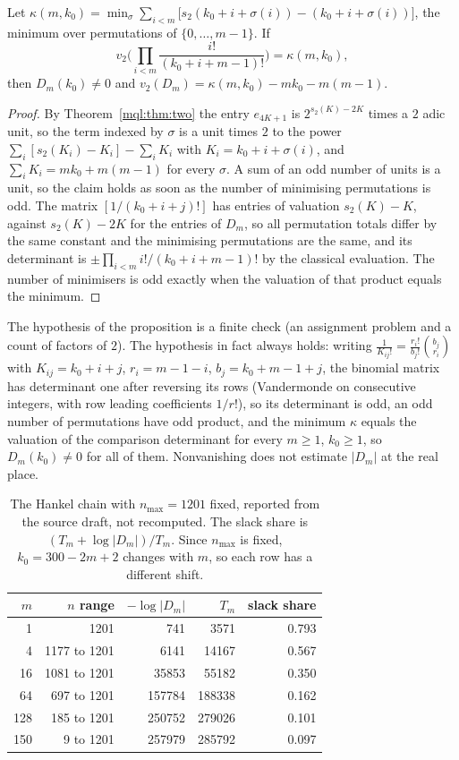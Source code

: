 \begin{proposition}\label{mql:prop:certificate}
Let $\kappa(m,k_0)=\min_\sigma\sum_{i<m}\big[s_2(k_0+i+\sigma(i))-(k_0+i+\sigma(i))\big]$, the minimum over permutations of $\{0,\dots,m-1\}$. If
\[
v_2\Big(\prod_{i<m}\frac{i!}{(k_0+i+m-1)!}\Big)=\kappa(m,k_0),
\]
then $D_m(k_0)\ne0$ and $v_2(D_m)=\kappa(m,k_0)-mk_0-m(m-1)$.
\end{proposition}

\begin{proof}
By Theorem~\ref{mql:thm:two} the entry $e_{4K+1}$ is $2^{s_2(K)-2K}$ times a $2$ adic unit, so the term indexed by $\sigma$ is a unit times $2$ to the power $\sum_i[s_2(K_i)-K_i]-\sum_iK_i$ with $K_i=k_0+i+\sigma(i)$, and $\sum_iK_i=mk_0+m(m-1)$ for every $\sigma$. A sum of an odd number of units is a unit, so the claim holds as soon as the number of minimising permutations is odd. The matrix $[1/(k_0+i+j)!]$ has entries of valuation $s_2(K)-K$, against $s_2(K)-2K$ for the entries of $D_m$, so all permutation totals differ by the same constant and the minimising permutations are the same, and its determinant is $\pm\prod_{i<m}i!/(k_0+i+m-1)!$ by the classical evaluation. The number of minimisers is odd exactly when the valuation of that product equals the minimum.
\end{proof}

The hypothesis of the proposition is a finite check (an assignment problem and a count of factors of $2$). The hypothesis in fact always holds: writing $\frac1{K_{ij}!}=\frac{r_i!}{b_j!}\binom{b_j}{r_i}$ with $K_{ij}=k_0+i+j$, $r_i=m-1-i$, $b_j=k_0+m-1+j$, the binomial matrix has determinant one after reversing its rows (Vandermonde on consecutive integers, with row leading coefficients $1/r!$), so its determinant is odd, an odd number of permutations have odd product, and the minimum $\kappa$ equals the valuation of the comparison determinant for every $m\ge1$, $k_0\ge1$, so $D_m(k_0)\ne0$ for all of them. Nonvanishing does not estimate $|D_m|$ at the real place.

\begin{table}[h]
\centering\small
\begin{tabular}{@{}rrrrr@{}}
\toprule
$m$ & $n$ range & $-\log|D_m|$ & $T_m$ & slack share\\
\midrule
1 & 1201 & 741 & 3571 & 0.793\\
4 & 1177 to 1201 & 6141 & 14167 & 0.567\\
16 & 1081 to 1201 & 35853 & 55182 & 0.350\\
64 & 697 to 1201 & 157784 & 188338 & 0.162\\
128 & 185 to 1201 & 250752 & 279026 & 0.101\\
150 & 9 to 1201 & 257979 & 285792 & 0.097\\
\bottomrule
\end{tabular}
\caption{The Hankel chain with $n_{\max}=1201$ fixed, reported from the source draft, not recomputed. The slack share is $(T_m+\log|D_m|)/T_m$. Since $n_{\max}$ is fixed, $k_0=300-2m+2$ changes with $m$, so each row has a different shift.}\label{mql:tab:chain}
\end{table}

